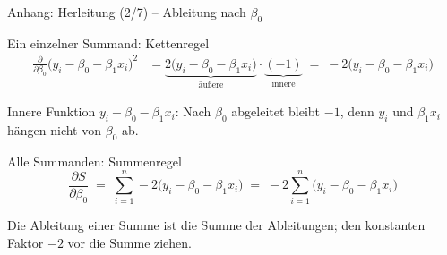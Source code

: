 \documentclass[aspectratio=169,11pt]{beamer}
\begin{document}
\begin{frame}{Anhang: Herleitung (2/7) -- Ableitung nach $\beta_0$}
  \begin{block}{Ein einzelner Summand: Kettenregel}
    \vspace{-6pt}
    \begin{align*}
      \frac{\partial}{\partial \beta_0}\bigl(y_i - \beta_0 - \beta_1 x_i\bigr)^{2}
        &= \underbrace{2\bigl(y_i - \beta_0 - \beta_1 x_i\bigr)}_{\text{äußere}}
           \cdot \underbrace{(-1)}_{\text{innere}}
         \;=\; -2\bigl(y_i - \beta_0 - \beta_1 x_i\bigr)
    \end{align*}
    \vspace{-10pt}

    \footnotesize Innere Funktion $y_i - \beta_0 - \beta_1 x_i$: Nach $\beta_0$
    abgeleitet bleibt $-1$, denn $y_i$ und $\beta_1 x_i$ hängen nicht von $\beta_0$ ab.
  \end{block}

  \medskip

  \begin{block}{Alle Summanden: Summenregel}
    \[
      \frac{\partial S}{\partial \beta_0}
      \;=\; \sum_{i=1}^{n} -2\bigl(y_i - \beta_0 - \beta_1 x_i\bigr)
      \;=\; -2\sum_{i=1}^{n}\bigl(y_i - \beta_0 - \beta_1 x_i\bigr)
    \]
    \vspace{-8pt}

    \footnotesize Die Ableitung einer Summe ist die Summe der Ableitungen; den
    konstanten Faktor $-2$ vor die Summe ziehen.
  \end{block}
\end{frame}
\end{document}
